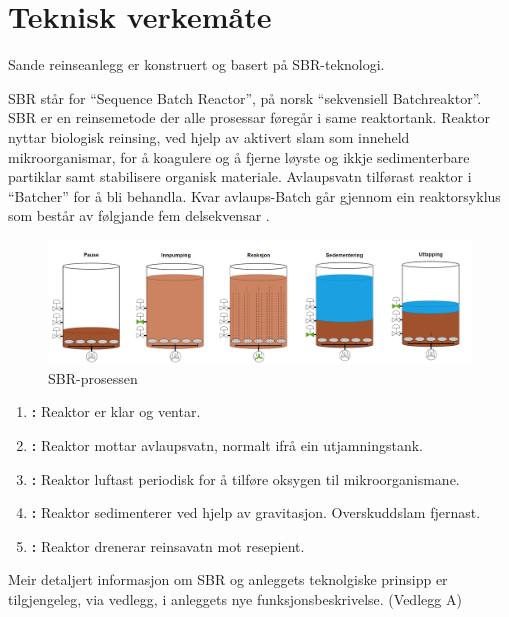 \newpage
\section{Teknisk verkemåte}
\thispagestyle{fancy}
Sande reinseanlegg er konstruert og basert på \gls{SBR}-teknologi.

\gls{SBR} står for ``Sequence \Gls{Batch} Reactor'', på norsk ``sekvensiell \gls{Batch}reaktor''.\newline
\gls{SBR} er en reinsemetode der alle prosessar føregår i same reaktortank. 
Reaktor nyttar biologisk reinsing, ved hjelp av aktivert slam som inneheld mikroorganismar, for å koagulere 
og å fjerne løyste og ikkje sedimenterbare partiklar samt stabilisere organisk materiale. 
Avlaupsvatn tilførast reaktor i ``\gls{Batch}er'' for å bli behandla. 
Kvar avlaups-\gls{Batch} går gjennom ein reaktorsyklus som består av følgjande fem delsekvensar \citep{Statsforvalter}.
\newline

\begin{figure}[htbp]
    \centering
    \includegraphics[width=1\textwidth]{Figurar/SBR-V2.png}
    \caption{\gls{SBR}-prosessen}\label{fig:SBR-Prosessen}
\end{figure}


\begin{enumerate}
    \item \textbf{:} Reaktor er klar og ventar.
    \item \textbf{:} Reaktor mottar avlaupsvatn, normalt ifrå ein utjamningstank.
    \item \textbf{:} Reaktor luftast periodisk for å tilføre oksygen til mikroorganismane.
    \item \textbf{:} Reaktor sedimenterer ved hjelp av gravitasjon. Overskuddslam fjernast.
    \item \textbf{:} Reaktor drenerar reinsavatn mot resepient.
\end{enumerate}

Meir detaljert informasjon om \gls{SBR} og anleggets teknolgiske prinsipp er tilgjengeleg, via vedlegg, i anleggets nye
funksjonsbeskrivelse. (Vedlegg A)

